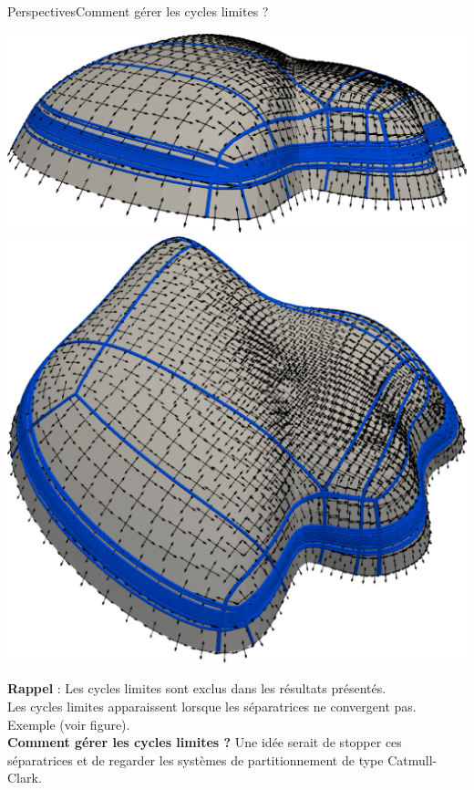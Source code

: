 \documentclass[compress,10pt,aspectratio=169]{beamer}
\begin{document}
\begin{frame}{Perspectives}{Comment gérer les cycles limites ?}
\small
\vspace{-0.5cm}
\begin{center}
\includegraphics[scale=0.15]{images/cycle_limit_1.pdf}\hspace{0.8cm}
\includegraphics[scale=0.15]{images/cycle_limit_2.pdf}
\end{center}
\textbf{Rappel} : Les cycles limites sont exclus dans les résultats présentés.\\\vspace{0.1cm}
Les cycles limites apparaissent lorsque les séparatrices ne convergent pas. Exemple (voir figure).\\\vspace{0.1cm}
\textbf{Comment gérer les cycles limites ?} Une idée serait de stopper ces séparatrices et de regarder les systèmes de partitionnement de type Catmull-Clark.

\end{frame}
\end{document}
